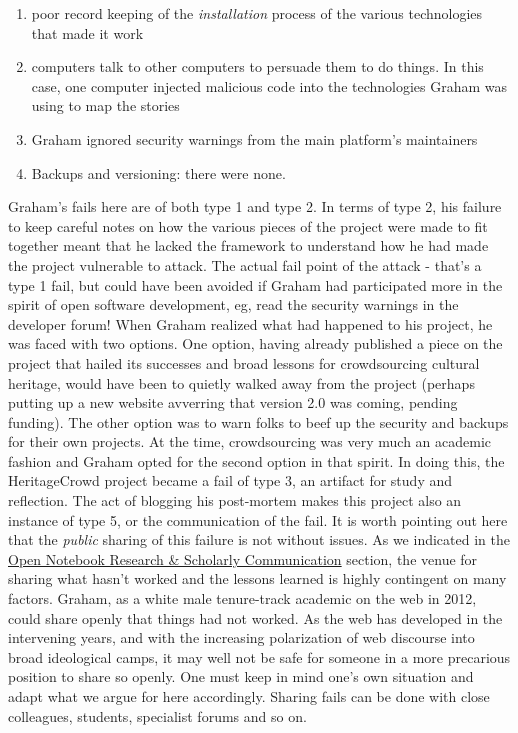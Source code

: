 \documentclass[english,]{book}
\providecommand{\tightlist}{%
  \setlength{\itemsep}{0pt}\setlength{\parskip}{0pt}}
\begin{document}
\begin{enumerate}
\def\labelenumi{\arabic{enumi}.}
\tightlist
\item
  poor record keeping of the \emph{installation} process of the various
  technologies that made it work
\item
  computers talk to other computers to persuade them to do things. In
  this case, one computer injected malicious code into the technologies
  Graham was using to map the stories
\item
  Graham ignored security warnings from the main platform's maintainers
\item
  Backups and versioning: there were none.
\end{enumerate}

Graham's fails here are of both type 1 and type 2. In terms of type 2,
his failure to keep careful notes on how the various pieces of the
project were made to fit together meant that he lacked the framework to
understand how he had made the project vulnerable to attack. The actual
fail point of the attack - that's a type 1 fail, but could have been
avoided if Graham had participated more in the spirit of open software
development, eg, read the security warnings in the developer forum! When
Graham realized what had happened to his project, he was faced with two
options. One option, having already published a piece on the project
that hailed its successes and broad lessons for crowdsourcing cultural
heritage, would have been to quietly walked away from the project
(perhaps putting up a new website avverring that version 2.0 was coming,
pending funding). The other option was to warn folks to beef up the
security and backups for their own projects. At the time, crowdsourcing
was very much an academic fashion and Graham opted for the second option
in that spirit. In doing this, the HeritageCrowd project became a fail
of type 3, an artifact for study and reflection. The act of blogging his
post-mortem makes this project also an instance of type 5, or the
communication of the fail. It is worth pointing out here that the
\emph{public} sharing of this failure is not without issues. As we
indicated in the
\protect\hyperlink{open-notebook-research-scholarly-communication}{Open
Notebook Research \& Scholarly Communication} section, the venue for
sharing what hasn't worked and the lessons learned is highly contingent
on many factors. Graham, as a white male tenure-track academic on the
web in 2012, could share openly that things had not worked. As the web
has developed in the intervening years, and with the increasing
polarization of web discourse into broad ideological camps, it may well
not be safe for someone in a more precarious position to share so
openly. One must keep in mind one's own situation and adapt what we
argue for here accordingly. Sharing fails can be done with close
colleagues, students, specialist forums and so on.
\end{document}
